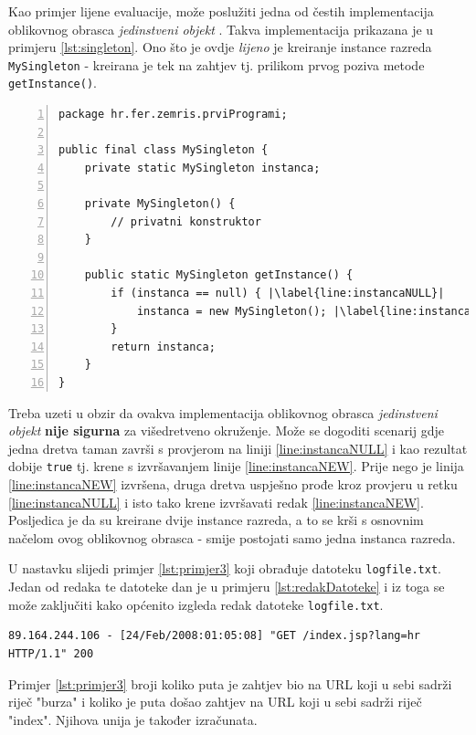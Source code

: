 \documentclass[times, utf8, zavrsni, numeric]{fer}
\begin{document}
Kao primjer lijene evaluacije, može poslužiti jedna od čestih implementacija oblikovnog obrasca \emph{jedinstveni objekt} . Takva implementacija prikazana je u primjeru \ref{lst:singleton}. Ono što je ovdje \emph{lijeno} je kreiranje instance razreda \texttt{MySingleton} - kreirana je tek na zahtjev tj. prilikom prvog poziva metode \texttt{getInstance()}.

\newpage
\begin{lstlisting}[numbers=left, label={lst:singleton}, caption={Lijena evaluacija u oblikovnom obrascu \emph{jedinstveni objekt}.}, escapechar=|]
package hr.fer.zemris.prviProgrami;

public final class MySingleton {
	private static MySingleton instanca;

	private MySingleton() {
		// privatni konstruktor
	}

	public static MySingleton getInstance() {
		if (instanca == null) { |\label{line:instancaNULL}|
			instanca = new MySingleton(); |\label{line:instancaNEW}|
		}
		return instanca;
	}
}
\end{lstlisting}

Treba uzeti u obzir da ovakva implementacija oblikovnog obrasca \emph{jedinstveni objekt} \textbf{nije sigurna} za višedretveno okruženje. Može se dogoditi scenarij gdje jedna dretva taman završi s provjerom na liniji \ref{line:instancaNULL} i kao rezultat dobije \texttt{true} tj. krene s izvršavanjem linije \ref{line:instancaNEW}. Prije nego je linija \ref{line:instancaNEW} izvršena, druga dretva uspješno prođe kroz provjeru u retku \ref{line:instancaNULL} i isto tako krene izvršavati redak \ref{line:instancaNEW}. Posljedica je da su kreirane dvije instance razreda, a to se krši s osnovnim načelom ovog oblikovnog obrasca - smije postojati samo jedna instanca razreda.



U nastavku slijedi primjer \ref{lst:primjer3} koji obrađuje datoteku \texttt{logfile.txt}.
Jedan od redaka te datoteke dan je u primjeru \ref{lst:redakDatoteke} i iz toga se može zaključiti kako općenito izgleda redak datoteke \texttt{logfile.txt}.
\begin{lstlisting}[label={lst:redakDatoteke}, basicstyle=\small, caption={Korištenje transformacija i akcija.}]
89.164.244.106 - [24/Feb/2008:01:05:08] "GET /index.jsp?lang=hr HTTP/1.1" 200
\end{lstlisting}

Primjer \ref{lst:primjer3} broji koliko puta je zahtjev bio na URL koji u sebi sadrži riječ "burza" i koliko je puta došao zahtjev na URL koji u sebi sadrži riječ "index". Njihova unija je također izračunata.
 
\end{document}
